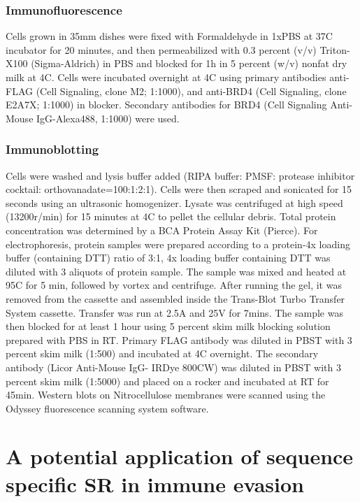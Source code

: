 \subsubsection{Immunofluorescence}
Cells grown in 35mm dishes were fixed with Formaldehyde in 1xPBS at 37C incubator for 20 minutes, and then permeabilized with 0.3 percent (v/v) Triton-X100 (Sigma-Aldrich) in PBS and blocked for 1h in 5 percent (w/v) nonfat dry milk at 4C. Cells were incubated overnight at 4C using primary antibodies anti-FLAG (Cell Signaling, clone M2; 1:1000), and anti-BRD4 (Cell Signaling, clone E2A7X; 1:1000)  in blocker. Secondary antibodies for BRD4 (Cell Signaling Anti-Mouse IgG-Alexa488, 1:1000) were used. 

\subsubsection{Immunoblotting}
Cells were washed and lysis buffer added (RIPA buffer: PMSF: protease inhibitor cocktail: orthovanadate=100:1:2:1). Cells were then scraped and sonicated for 15 seconds using an ultrasonic homogenizer. Lysate was centrifuged at high speed (13200r/min) for 15 minutes at 4C to pellet the cellular debris. Total protein concentration was determined by a BCA Protein Assay Kit (Pierce). For electrophoresis, protein samples were prepared according to a protein-4x loading buffer (containing DTT) ratio of 3:1, 4x loading buffer containing DTT was diluted with 3 aliquots of protein sample. The sample was mixed and heated at 95C for 5 min, followed by vortex and centrifuge. After running the gel, it was removed from the cassette and assembled inside the Trans-Blot Turbo Transfer System cassette. Transfer was run at 2.5A and 25V for 7mins. The sample was then blocked for at least 1 hour using 5 percent skim milk blocking solution prepared with PBS in RT. Primary FLAG antibody was diluted in PBST with 3 percent skim milk (1:500) and incubated at 4C overnight. The secondary antibody (Licor Anti-Mouse IgG- IRDye 800CW) was diluted in PBST with 3 percent skim milk (1:5000) and placed on a rocker and incubated at RT for 45min. Western blots on Nitrocellulose membranes were scanned using the Odyssey fluorescence scanning system software.

\section{A potential application of sequence specific SR in immune evasion}

